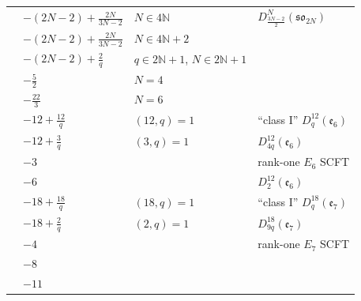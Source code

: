 \begin{table}[]
\begin{tabularx}{\textwidth}{
|>{\centering\arraybackslash}p{}
|>{\raggedright\arraybackslash}p{}
|>{\raggedright\arraybackslash}p{}
|X|
}
& \cellcolor{newSCFT} $-(2N-2)+\frac{2N}{3N-2}$ & \cellcolor{newSCFT} $N\in4\mathbb N$ & \cellcolor{newSCFT} \qquad $D_{\frac{3N-2}{2}}^{N}(\mathfrak{so}_{2N})$ \\
\hhline{~---}

& $-(2N-2)+\frac{2N}{3N-2}$ & $N\in4\mathbb N+2$ & \\
\hhline{~---}

& $-(2N-2)+\frac{2}{q}$ & $q\in2\mathbb N+1$, \quad $N \in 2\mathbb{N}+1$ & \\
\hhline{~---}

& $-\frac{5}{2}$ & $N=4$ & \\
\hhline{~---}

& $-\frac{22}{3}$ & $N=6$ & \\
\hline

\multirow{4}{*}{$V_k(\mathfrak e_6)$} & \cellcolor{knownSCFT}$-12+\frac{12}{q}$ & \cellcolor{knownSCFT}$(12,q)=1$ & \cellcolor{knownSCFT}``class I'' $D_q^{12}(\mathfrak e_6)$ \\
\hhline{~---}

&  \cellcolor{newSCFT} $-12+\frac{3}{q}$ & \cellcolor{newSCFT} $(3,q)=1$ &  \cellcolor{newSCFT} \qquad $D_{4q}^{12}(\mathfrak e_6)$ \\
\hhline{~---}

& \cellcolor{knownSCFT}$-3$ & \cellcolor{knownSCFT} & \cellcolor{knownSCFT}rank-one $E_6$ SCFT \\
\hhline{~---}

& \cellcolor{newSCFT} $-6$ & \cellcolor{newSCFT} & \cellcolor{newSCFT} \qquad $D_{2}^{12}(\mathfrak e_6)$ \\
\hline

\multirow{5}{*}{$V_k(\mathfrak e_7)$} & \cellcolor{knownSCFT}$-18+\frac{18}{q}$ & \cellcolor{knownSCFT}$(18,q)=1$ & \cellcolor{knownSCFT}``class I'' $D_q^{18}(\mathfrak e_7)$ \\
\hhline{~---}

& \cellcolor{newSCFT} $-18+\frac{2}{q}$ & \cellcolor{newSCFT} $(2,q)=1$ & \cellcolor{newSCFT} \qquad $D^{18}_{9q}(\mathfrak{e}_7)$ \\
\hhline{~---}

& \cellcolor{knownSCFT}$-4$ & \cellcolor{knownSCFT} & \cellcolor{knownSCFT}rank-one $E_7$ SCFT \\
\hhline{~---}

& $-8$ & & \\
\hhline{~---}

& $-11$ & & \\
\hline


\end{tabularx}
\end{table}

